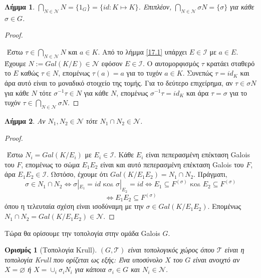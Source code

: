 \documentclass[oneside,a4paper]{article}
\newtheorem{lemma}{Λήμμα}
\newtheorem*{defn}{Ορισμός}
\newcommand {\tl}{\textlatin}
\begin{document}
\begin{lemma} \label{17.3}  $\bigcap_{N \in \mathcal{N}} N= \{1_G \} = \{ id: K \mapsto K \}$. Επιπλέον, $\bigcap_{N \in \mathcal{N}} \sigma N = \{\sigma \}$ για κάθε $\sigma \in G$.
\end{lemma}
\begin{proof} $ $

$ $\newline	
Έστω $\tau \in \bigcap_{N \in \mathcal{N}} N$ και $a \in K$. Από το λήμμα \ref{17.1} υπάρχει  $E \in \mathcal{I}$ με $a \in E$. Έχουμε $N := Gal(K/E) \in \mathcal{N}$ εφόσον $E \in \mathcal{I}$. Ο αυτομορφισμός $\tau$ κρατάει σταθερό το $E$ καθώς $\tau \in N$, επομένως $\tau (a) = a$ για το τυχόν $a \in K$. Συνεπώς $\tau = id_K$ και άρα αυτό είναι το μοναδικό στοιχείο της τομής. Για το δεύτερο επιχείρημα, αν $\tau \in \sigma N$ για κάθε $N$ τότε $\sigma^{-1} \tau \in N$ για κάθε $N$, επομένως $\sigma^{-1} \tau = id_K$ και άρα $\tau = \sigma$ για το τυχόν $\tau \in \bigcap_{N \in \mathcal{N}} \sigma N$.
\end{proof}

\begin{lemma} \label{17.4} Αν $N_1 , N_2 \in \mathcal{N}$ τότε $N_1 \cap N_2 \in \mathcal{N}$.
\end{lemma}
\begin{proof} $ $

$ $\newline
Έστω $N_i = Gal(K/E_i)$ με $E_i \in \mathcal{I}$. Κάθε $E_i$ είναι πεπερασμένη επέκταση \tl{Galois} του $F$, επομένως το σώμα $E_1 E_2$ είναι και αυτό πεπερασμένη επέκταση \tl{Galois} του $F$, άρα $E_1 E_2 \in \mathcal{I}$. Ωστόσο, έχουμε ότι $Gal(K/E_1 E_2) = N_1 \cap N_2$. Πράγματι,
$$\sigma \in N_1 \cap N_2 \iff \sigma|_{E_1} = id \text{ και } \sigma|_{E_2}=id \iff E_1 \subseteq F^{(\sigma)} \text{ και } E_2 \subseteq F^{(\sigma)}$$
$$\iff E_1 E_2 \subseteq F^{(\sigma)}$$
όπου η τελευταία σχέση είναι ισοδύναμη με την $\sigma \in Gal(K/E_1 E_2)$. Επομένως $N_1 \cap N_2 = Gal(K/E_1 E_2) \in \mathcal{N}$.
\end{proof}

\noindent Τώρα θα ορίσουμε την τοπολογία στην ομάδα \tl{Galois} $G$.

\begin{defn}[Τοπολογία \tl{Krull}] $(G,\mathcal{T})$ είναι τοπολογικός χώρος όπου $\mathcal{T}$ είναι η τοπολογία \tl{Krull} που ορίζεται ως εξής:
Ένα υποσύνολο $X$ του $G$ είναι ανοιχτό αν $X=\varnothing$ ή $X= \cup_i \sigma_i N_i$ για κάποια $\sigma_i \in G$ και $N_i \in \mathcal{N}$.
\end{defn}
\end{document}
